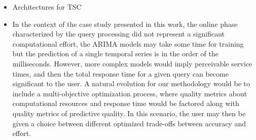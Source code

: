 \begin{itemize}
    
    \item Architectures for TSC
    
    \item In the context of the case study presented in this work, the online phase characterized by the query processing did not represent a significant computational effort, the ARIMA models may take some time for training but the prediction of a single temporal series is in the order of the milliseconds. However, more complex models would imply perceivable service times, and then the total response time for a given query can become significant to the user. A natural evolution for our methodology would be to include a multi-objective optimization process, where quality metrics about computational resources and response time would be factored along with quality metrics of predictive quality. In this scenario, the user may then be given a choice between different optimized trade-offs between accuracy and effort.
\end{itemize}

